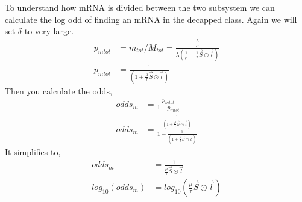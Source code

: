 \documentclass[review]{elsarticle}
\newcommand{\imax}{\ensuremath{i_{\max}}\xspace}
\begin{document}
To understand how mRNA is divided  between the two subsystem we can calculate the log odd of finding an mRNA in the decapped class. Again we will set $\delta$ to very large.
\begin{align*}
	p_{mtot} &= m_{tot}/M_{tot} = \frac{\frac{\lambda}{\mu}}{\lambda(\frac{1}{\mu} + \frac{1}{\tau}\vec{S} \odot \vec{l})}	\\
	p_{mtot} &= \frac{1}{(1  + \frac{\mu}{\tau}\vec{S} \odot \vec{l})}	
\end{align*}
Then you calculate the odds,
\begin{align*}
	odds_{m}& = \frac{p_{mtot}}{1-p_{mtot}}\\
	odds_{m} &= \frac{\frac{1}{(1  + \frac{\mu}{\tau}\vec{S} \odot \vec{l})}}{1-\frac{1}{(1  + \frac{\mu}{\tau}\vec{S} \odot \vec{l})}}
\end{align*}
It simplifies to,
\begin{align*}
	odds_{m} &= \frac{1}{\frac{\mu}{\tau}\vec{S} \odot \vec{l}} \\
	log_{10}(odds_{m}) &= log_{10}(\frac{\mu}{\tau}\vec{S} \odot \vec{l})
\end{align*}





%
%
\end{document}

